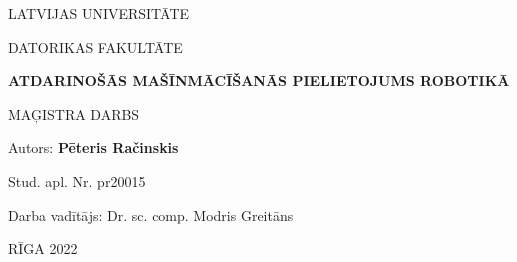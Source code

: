 \begin{titlepage}
    \begin{center}
        \vspace*{3cm}
        
        LATVIJAS UNIVERSITĀTE

        DATORIKAS FAKULTĀTE

        \vspace*{4cm}

        \large\textbf{ATDARINOŠĀS MAŠĪNMĀCĪŠANĀS PIELIETOJUMS ROBOTIKĀ}
        
        \vspace{2cm}
        \normalsize{MAĢISTRA DARBS}
         
             
    \end{center}
    \vspace{3cm}
    \begin{addmargin}[18em]{0em}
    Autors: \textbf{Pēteris Račinskis}
    \end{addmargin}

    \begin{addmargin}[18em]{0em}
    \hspace{1cm} Stud. apl. Nr. pr20015
    \end{addmargin}

    \begin{addmargin}[18em]{0em}
    Darba vadītājs: Dr. sc. comp. Modris Greitāns
    \end{addmargin}
         
    \vfill
    \begin{center}
    RĪGA 2022
    \end{center}
 \end{titlepage}